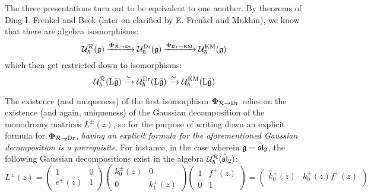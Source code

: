             The three presentations turn out to be equivalent to one another. By theorems of Ding-I. Frenkel and Beck (later on clarified by E. Frenkel and Mukhin), we know that there are algebra isomorphisms:
                $$\mathcal{U}_{\hbar}^{\mathcal{R}}(\mathfrak{g}) \xrightarrow[]{\boldsymbol{\Phi}_{\mathcal{R} \to \mathrm{Dr}}} \mathcal{U}_{\hbar}^{\mathrm{Dr}}(\mathfrak{g}) \xrightarrow[]{\boldsymbol{\Phi}_{\mathrm{Dr} \to \mathrm{KM}}} \mathcal{U}_{\hbar}^{\mathrm{KM}}(\mathfrak{g})$$
            which then get restricted down to isomorphisms:
                $$\mathcal{U}_{\hbar}^{\mathcal{R}}(\mathrm{L} \bar{\mathfrak{g}}) \xrightarrow[]{\simeq} \mathcal{U}_{\hbar}^{\mathrm{Dr}}(\mathrm{L} \bar{\mathfrak{g}}) \xrightarrow[]{\simeq} \mathcal{U}_{\hbar}^{\mathrm{KM}}(\mathrm{L} \bar{\mathfrak{g}})$$
            \begin{remark} \label{remark: gaussian_decompositions_of_monodromy_matrices}
                The existence (and uniqueness) of the first isomorphism $\boldsymbol{\Phi}_{\mathcal{R} \to \mathrm{Dr}}$ relies on the existence (and again, uniqueness) of the Gaussian decomposition of the monodromy matrices $L^{\pm}(z)$, so for the purpose of writing down an explicit formula for $\boldsymbol{\Phi}_{\mathcal{R} \to \mathrm{Dr}}$, \textit{having an explicit formula for the aforementioned Gaussian decomposition is a prerequisite}. For instance, in the case wherein $\mathfrak{g} = \hat{\mathfrak{sl}}_2$, the following Gaussian decompositions exist in the algebra $\mathcal{U}_{\hbar}^{\mathcal{R}}(\hat{\mathfrak{sl}}_2)$:
                    \begin{equation} \label{equation: quantum_affine_sl_2_monodromy_matrices_gaussian_decompositions}
                        L^{\pm}(z)
                        =
                        \begin{pmatrix}
                            1 & 0
                            \\
                            e^{\pm}(z) & 1
                        \end{pmatrix}
                        \begin{pmatrix}
                            k_0^{\pm}(z) & 0
                            \\
                            0 & k_1^{\pm}(z)
                        \end{pmatrix}
                        \begin{pmatrix}
                            1 & f^{\pm}(z)
                            \\
                            0 & 1
                        \end{pmatrix}
                        =
                        \begin{pmatrix}
                            k_0^{\pm}(z) & k_0^{\pm}(z) f^{\pm}(z)
                            \\

\end{pmatrix}
\end{equation}
\end{remark}
